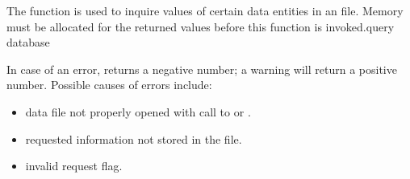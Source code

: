 The function  is used to inquire values of certain
data entities in an \exo{} file. Memory must be allocated for the
returned values before this function is invoked.query database


In case of an error,  returns a negative 
number; a warning will return a positive number.
Possible causes of errors include:

\begin{itemize}
 \item data file not properly opened with call to  or
 .
 \item requested information not stored in the file.
 \item invalid request flag.
\end{itemize}



